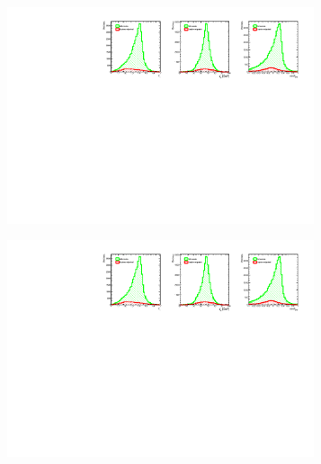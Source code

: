 \begin{figure}
	\centering
	\begin{subfigure}{0.33\textwidth}
		\includegraphics[clip, trim=0.1cm 0cm 13.9cm 0cm,width=0.99\textwidth]{ILD/plots/top-lepton-variables.pdf}
		\caption{\label{fig:TopChiVariables_a_3} }
	\end{subfigure}%
	\begin{subfigure}{0.33\textwidth}
		\centering
		\includegraphics[clip, trim=6.78cm 0cm 7.3cm 0cm,width=0.99\textwidth]{ILD/plots/top-lepton-variables.pdf}
		\caption{\label{fig:TopChiVariables_b_3} }
	\end{subfigure}
	\begin{subfigure}{0.33\textwidth}
		\centering

\end{subfigure}
\end{figure}
